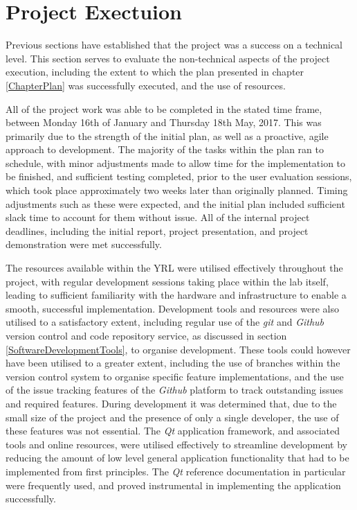 
\section{Project Exectuion}

Previous sections have established that the project was a success on a technical level. This section serves to evaluate the non-technical aspects of the project execution, including the extent to which the plan presented in chapter \ref{ChapterPlan} was successfully executed, and the use of resources.

All of the project work was able to be completed in the stated time frame, between Monday 16th of January and Thursday 18th May, 2017. This was primarily due to the strength of the initial plan, as well as a proactive, agile approach to development. The majority of the tasks within the plan ran to schedule, with minor adjustments made to allow time for the implementation to be finished, and sufficient testing completed, prior to the user evaluation sessions, which took place approximately two weeks later than originally planned. Timing adjustments such as these were expected, and the initial plan included sufficient slack time to account for them without issue. All of the internal project deadlines, including the initial report, project presentation, and project demonstration were met successfully.

The resources available within the YRL were utilised effectively throughout the project, with regular development sessions taking place within the lab itself, leading to sufficient familiarity with the hardware and infrastructure to enable a smooth, successful implementation. Development tools and resources were also utilised to a satisfactory extent, including regular use of the \textit{git} and \textit{Github} version control and code repository service, as discussed in section \ref{SoftwareDevelopmentTools}, to organise development. These tools could however have been utilised to a greater extent, including the use of branches within the version control system to organise specific feature implementations, and the use of the issue tracking features of the \textit{Github} platform to track outstanding issues and required features. During development it was determined that, due to the small size of the project and the presence of only a single developer, the use of these features was not essential. The \textit{Qt} application framework, and associated tools and online resources, were utilised effectively to streamline development by reducing the amount of low level general application functionality that had to be implemented from first principles. The \textit{Qt} reference documentation \cite{QtDocs} in particular were frequently used, and proved instrumental in implementing the application successfully.

